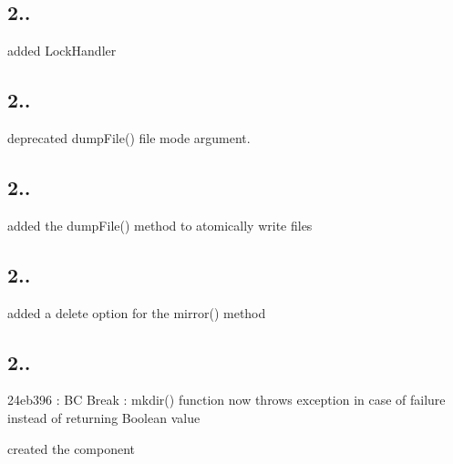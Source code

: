 \subsection*{2.. }


\begin{DoxyItemize}
\item added Lock\+Handler
\end{DoxyItemize}

\subsection*{2.. }


\begin{DoxyItemize}
\item deprecated dump\+File() file mode argument.
\end{DoxyItemize}

\subsection*{2.. }


\begin{DoxyItemize}
\item added the dump\+File() method to atomically write files
\end{DoxyItemize}

\subsection*{2.. }


\begin{DoxyItemize}
\item added a delete option for the mirror() method
\end{DoxyItemize}

\subsection*{2.. }


\begin{DoxyItemize}
\item 24eb396 \+: B\+C Break \+: mkdir() function now throws exception in case of failure instead of returning Boolean value
\item created the component 
\end{DoxyItemize}